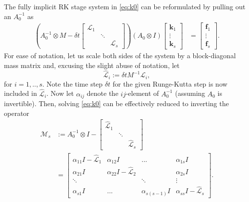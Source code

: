 \documentclass[review]{siamart}
\begin{document}
The fully implicit RK stage system in \eqref{eq:k0} can be reformulated by pulling out 
an $A_0^{-1}$ as \cite{pazner17}
%
\begin{align}\label{eq:keq}
\left( A_0^{-1}\otimes M - \delta t \begin{bmatrix} \mathcal{L}_1  & \\ & \ddots \\ && \mathcal{L}_s\end{bmatrix}\right)
	(A_0\otimes I)	\begin{bmatrix} \mathbf{k}_1 \\ \vdots \\ \mathbf{k}_s \end{bmatrix} 
& = \begin{bmatrix} \mathbf{f}_1 \\ \vdots \\ \mathbf{f}_s \end{bmatrix}.
\end{align}
%
For ease of notation, let us scale both sides of the system by a block-diagonal mass matrix 
and, excusing the slight abuse of notation, let
%
\begin{equation*}
\widehat{\mathcal{L}}_i := \delta t M^{-1}\mathcal{L}_i,
\end{equation*}
%
for $i=1,..,s$. Note the time step $\delta t$ for the given Runge-Kutta step is now included in $\widehat{\mathcal{L}}_i$. Now let $\alpha_{ij}$ denote the $ij$-element of $A_0^{-1}$ (assuming $A_0$ is
invertible). Then, solving \eqref{eq:k0} can be effectively reduced to inverting the operator
%
\begin{align}\nonumber
\mathcal{M}_s & := A_0^{-1}\otimes I - \begin{bmatrix} \widehat{\mathcal{L}}_1  & \\ & \ddots \\ && \widehat{\mathcal{L}}_s\end{bmatrix} \\
& = \begin{bmatrix} \alpha_{11}I - \widehat{\mathcal{L}}_1 & \alpha_{12}I & ... & \alpha_{1s}I \\
	\alpha_{21}I & \alpha_{22}I - \widehat{\mathcal{L}}_2 & & \alpha_{2s}I \\
	\ddots & & \ddots & \vdots \\ \alpha_{s1}I & ... & \alpha_{s(s-1)}I & \alpha_{ss}I - \widehat{\mathcal{L}}_s \end{bmatrix}.
	\label{eq:k1}
\end{align}
%
\end{document}

